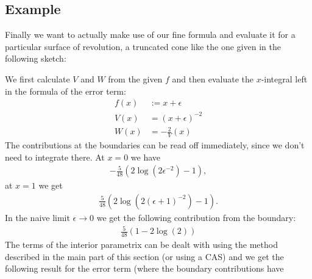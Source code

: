 \subsection{Example}
Finally we want to actually make use of our fine formula and evaluate it for a
particular surface of revolution, a truncated cone like the one given in the
following sketch:
\begin{center}
\end{center}
We first calculate $V$ and $W$ from the given $f$ and then evaluate the
$x$-integral left in the formula of the error term:
\begin{align}
  f(x) &:= x + \epsilon \\
  V(x) &= (x + \epsilon)^{-2} \\
  W(x) &= -\frac 2 V(x)
\end{align}
The contributions at the boundaries can be read off immediately, since we don't
need to integrate there. At $x=0$ we have
\begin{align}
  \label{res:boundary0}
  -\frac{5}{48}(2\log(2\epsilon^{-2}) - 1),
\end{align}
at $x=1$ we get
\begin{align*}
  \label{res:boundary1}
  \frac{5}{48}(2\log(2(\epsilon + 1)^{-2}) -1).
\end{align*}
In the naive limit $\epsilon\to0$ we get the following contribution from the
boundary:
\begin{align*}
  \frac{5}{48}(1-2\log(2))
\end{align*}
The terms of the interior parametrix can be dealt with using the method
described in the main part of this section (or using a CAS) and we get the
following result for the error term (where the boundary contributions have
